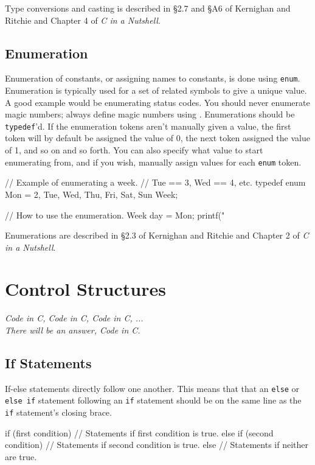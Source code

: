 \documentclass[11pt]{article}
\begin{document}
Type conversions and casting is described in \S 2.7 and \S A6 of Kernighan and
Ritchie and Chapter 4 of \emph{C in a Nutshell}.


\subsection{Enumeration}

Enumeration of constants, or assigning names to constants, is done using
\texttt{enum}. Enumeration is typically used for a set of related symbols to
give a unique value. A good example would be enumerating status codes. You
should never enumerate magic numbers; always define magic numbers using
. Enumerations should be \texttt{typedef}'d. If the enumeration
tokens aren't manually given a value, the first token will by default be
assigned the value of 0, the next token assigned the value of 1, and so on and
so forth. You can also specify what value to start enumerating from, and if you
wish, manually assign values for each \texttt{enum} token.

\begin{clisting}{}
// Example of enumerating a week.
// Tue == 3, Wed == 4, etc.
typedef enum { Mon = 2, Tue, Wed, Thu, Fri, Sat, Sun } Week;

// How to use the enumeration.
Week day = Mon;
printf("%
\end{clisting}

Enumerations are described in \S 2.3 of Kernighan and Ritchie and Chapter 2 of
\emph{C in a Nutshell}.


\section{Control Structures}

\textwidth
\epigraph{\emph{Code in C, Code in C, Code in C, ...\\ There will be an answer,
Code in C.}}{}


\subsection{If Statements}

If-else statements directly follow one another. This means that that an
\texttt{else} or \texttt{else if} statement following an \texttt{if} statement
should be on the same line as the \texttt{if} statement's closing brace.

\begin{clisting}{}
if (first condition) {
    // Statements if first condition is true.
} else if (second condition) {
    // Statements if second condition is true.
} else {
    // Statements if neither are true.
}
\end{clisting}
\end{document}
